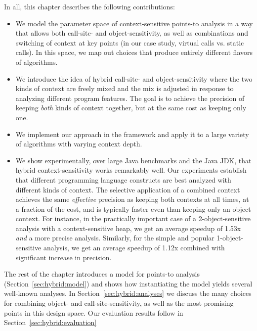 In all, this chapter describes the following contributions:

\begin{itemize}
\item We model the parameter space of context-sensitive points-to analysis in a way that allows both call-site- and object-sensitivity, as well as combinations and switching of context at key points (in our case study, virtual calls vs. static calls). In this space, we map out choices that produce entirely different flavors of algorithms.

\item We introduce the idea of hybrid call-site- and object-sensitivity where the two kinds of context are freely mixed and the mix is adjusted in response to analyzing different program features. The goal is to achieve the precision of keeping \emph{both} kinds of context together, but at the same cost as keeping only one.

\item We implement our approach in the \doop{} framework and apply it to a large variety of algorithms with varying context depth.

\item We show experimentally, over large Java benchmarks and the Java JDK, that hybrid context-sensitivity works remarkably well. Our experiments establish that different programming language constructs are best analyzed with different kinds of context. The selective application of a combined context achieves the same \emph{effective} precision as keeping both contexts at all times, at a fraction of the cost, and is typically faster even than keeping only an object context. For instance, in the practically important case of a 2-object-sensitive analysis with a context-sensitive heap, we get an average speedup of 1.53x \emph{and} a more precise analysis. Similarly, for the simple and popular 1-object-sensitive analysis, we get an average speedup of 1.12x combined with significant increase in precision.
\end{itemize}

The rest of the chapter introduces a model for points-to analysis (Section~\ref{sec:hybrid:model}) and shows how instantiating the model yields several well-known analyses. In Section~\ref{sec:hybrid:analyses} we discuss the many choices for combining object- and call-site-sensitivity, as well as the most promising points in this design space. Our evaluation results follow in Section~\ref{sec:hybrid:evaluation}


